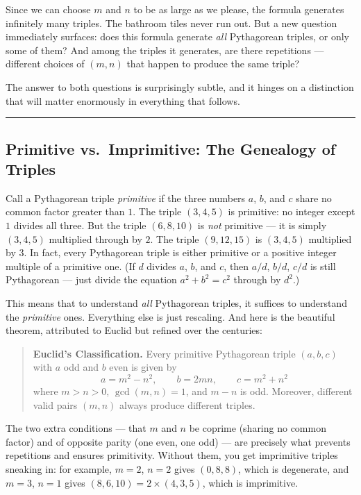 Since we can choose \(m\) and \(n\) to be as large as we please, the formula generates infinitely many triples. The bathroom tiles never run out. But a new question immediately surfaces: does this formula generate \emph{all} Pythagorean triples, or only some of them? And among the triples it generates, are there repetitions --- different choices of \((m, n)\) that happen to produce the same triple?

The answer to both questions is surprisingly subtle, and it hinges on a distinction that will matter enormously in everything that follows.

\bigskip\noindent\rule{\linewidth}{0.4pt}\bigskip

\subsection*{Primitive vs.~Imprimitive: The Genealogy of Triples}
Call a Pythagorean triple \emph{primitive} if the three numbers \(a\), \(b\), and \(c\) share no common factor greater than \(1\). The triple \((3, 4, 5)\) is primitive: no integer except \(1\) divides all three. But the triple \((6, 8, 10)\) is \emph{not} primitive --- it is simply \((3, 4, 5)\) multiplied through by \(2\). The triple \((9, 12, 15)\) is \((3, 4, 5)\) multiplied by \(3\). In fact, every Pythagorean triple is either primitive or a positive integer multiple of a primitive one. (If \(d\) divides \(a\), \(b\), and \(c\), then \(a/d\), \(b/d\), \(c/d\) is still Pythagorean --- just divide the equation \(a^2 + b^2 = c^2\) through by \(d^2\).)

This means that to understand \emph{all} Pythagorean triples, it suffices to understand the \emph{primitive} ones. Everything else is just rescaling. And here is the beautiful theorem, attributed to Euclid but refined over the centuries:

\begin{quote}
\textbf{Euclid's Classification.} Every primitive Pythagorean triple \((a, b, c)\) with \(a\) odd and \(b\) even is given by \[a = m^2 - n^2, \qquad b = 2mn, \qquad c = m^2 + n^2\] where \(m > n > 0\), \(\gcd(m, n) = 1\), and \(m - n\) is odd. Moreover, different valid pairs \((m, n)\) always produce different triples.
\end{quote}

The two extra conditions --- that \(m\) and \(n\) be coprime (sharing no common factor) and of opposite parity (one even, one odd) --- are precisely what prevents repetitions and ensures primitivity. Without them, you get imprimitive triples sneaking in: for example, \(m = 2\), \(n = 2\) gives \((0, 8, 8)\), which is degenerate, and \(m = 3\), \(n = 1\) gives \((8, 6, 10) = 2 \times (4, 3, 5)\), which is imprimitive.

